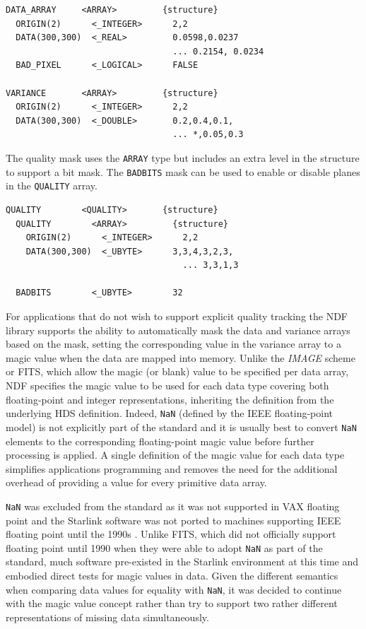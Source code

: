 \documentclass[final,authoryear,5p,times,twocolumn]{elsarticle}
\begin{document}
{\small
\begin{verbatim}
DATA_ARRAY     <ARRAY>         {structure}
  ORIGIN(2)      <_INTEGER>      2,2
  DATA(300,300)  <_REAL>         0.0598,0.0237
                                 ... 0.2154, 0.0234
  BAD_PIXEL      <_LOGICAL>      FALSE

VARIANCE       <ARRAY>         {structure}
  ORIGIN(2)      <_INTEGER>      2,2
  DATA(300,300)  <_DOUBLE>       0.2,0.4,0.1,
                                 ... *,0.05,0.3
\end{verbatim}
}

The quality mask uses the \texttt{ARRAY} type but includes an extra
level in the structure to support a bit mask. The \texttt{BADBITS}
mask can be used to enable or disable planes in the \texttt{QUALITY} array.

{\small
\begin{verbatim}
QUALITY        <QUALITY>       {structure}
  QUALITY        <ARRAY>         {structure}
    ORIGIN(2)      <_INTEGER>      2,2
    DATA(300,300)  <_UBYTE>      3,3,4,3,2,3,
                                   ... 3,3,1,3

  BADBITS        <_UBYTE>        32
\end{verbatim}
}

For applications that do not wish to support explicit quality tracking
the NDF library supports the ability to automatically mask the data
and variance arrays based on the mask, setting the corresponding value
in the variance array to a magic value when the data are mapped into
memory. Unlike the \emph{IMAGE} scheme
or FITS, which allow the magic (or blank) value to be specified per
data array, NDF specifies the magic value to be used for each data type
covering both floating-point and integer representations, inheriting
the definition from the underlying HDS definition. Indeed,
\texttt{NaN} (defined by the IEEE floating-point model) is not explicitly part of the standard and it is usually
best to convert \texttt{NaN} elements to the corresponding floating-point magic
value before further processing is applied. A single definition of the
magic value for each data type simplifies applications programming and
removes the need for the additional overhead of providing a value for
every primitive data array.

\texttt{NaN} was excluded from the standard as it was not
supported in VAX floating point \citep[see e.g.][]{660194} and the Starlink
software was not ported to machines supporting IEEE floating point
until the 1990s \citep[e.g.,][]{1991STARB...8...11C}. Unlike FITS, which
did not officially support floating point until 1990
\citep{1989FPFITS,1991BAAS...23..993S} when they were able to adopt
\texttt{NaN} as part of the standard, much software pre-existed
in the Starlink environment at this time and embodied
direct tests for magic values in data. Given the different semantics
when comparing data values for equality with \texttt{NaN}, it was decided to
continue with the magic value concept rather than try to support two
rather different representations of missing data simultaneously.
\end{document}

